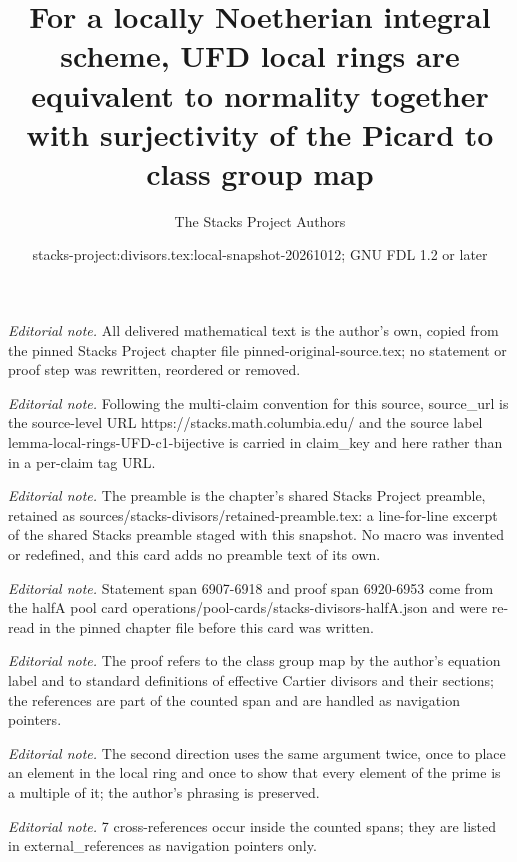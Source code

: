 \documentclass[10pt,a4paper]{amsart}
\title{For a locally Noetherian integral scheme, UFD local rings are equivalent to normality together with surjectivity of the Picard to class group map}
\author{The Stacks Project Authors}
\date{stacks-project:divisors.tex:local-snapshot-20261012; GNU FDL 1.2 or later}
\theoremstyle{plain}
\theoremstyle{definition}
\theoremstyle{remark}
\numberwithin{equation}{subsection}
\begin{document}
\maketitle
\noindent\textit{Editorial note.} All delivered mathematical text is the author's own, copied from the pinned Stacks Project chapter file pinned-original-source.tex; no statement or proof step was rewritten, reordered or removed.\par\medskip
\noindent\textit{Editorial note.} Following the multi-claim convention for this source, source\_url is the source-level URL https://stacks.math.columbia.edu/ and the source label lemma-local-rings-UFD-c1-bijective is carried in claim\_key and here rather than in a per-claim tag URL.\par\medskip
\noindent\textit{Editorial note.} The preamble is the chapter's shared Stacks Project preamble, retained as sources/stacks-divisors/retained-preamble.tex: a line-for-line excerpt of the shared Stacks preamble staged with this snapshot. No macro was invented or redefined, and this card adds no preamble text of its own.\par\medskip
\noindent\textit{Editorial note.} Statement span 6907-6918 and proof span 6920-6953 come from the halfA pool card operations/pool-cards/stacks-divisors-halfA.json and were re-read in the pinned chapter file before this card was written.\par\medskip
\noindent\textit{Editorial note.} The proof refers to the class group map by the author's equation label and to standard definitions of effective Cartier divisors and their sections; the references are part of the counted span and are handled as navigation pointers.\par\medskip
\noindent\textit{Editorial note.} The second direction uses the same argument twice, once to place an element in the local ring and once to show that every element of the prime is a multiple of it; the author's phrasing is preserved.\par\medskip
\noindent\textit{Editorial note.} 7 cross-references occur inside the counted spans; they are listed in external\_references as navigation pointers only.\par\medskip
\end{document}
